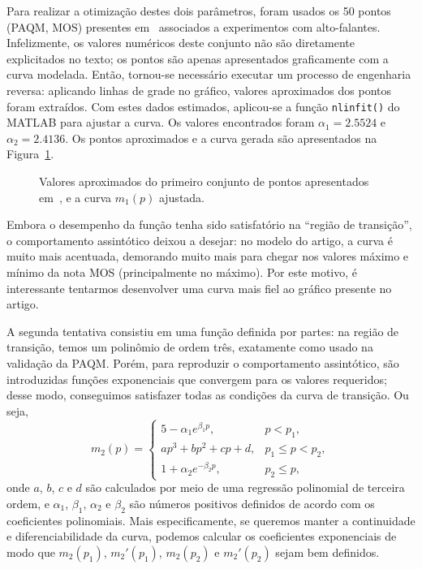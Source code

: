 Para realizar a otimização destes dois parâmetros, foram usados os 50 pontos (PAQM, MOS) presentes em~\cite{beerends-2002} associados a experimentos com alto-falantes. Infelizmente, os valores numéricos deste conjunto não são diretamente explicitados no texto; os pontos são apenas apresentados graficamente com a curva modelada. Então, tornou-se necessário executar um processo de engenharia reversa: aplicando linhas de grade no gráfico, valores aproximados dos pontos foram extraídos. Com estes dados estimados, aplicou-se a função \texttt{nlinfit()} do MATLAB para ajustar a curva. Os valores encontrados foram $\alpha_1 = 2.5524$ e $\alpha_2 = 2.4136$. Os pontos aproximados e a curva gerada são apresentados na Figura~\ref{fig:paqmtomos:sigmoid2}.

\begin{figure}[!ht]
    \centering
    
    \caption[Sigmoide com dois parâmetros de conversão de PAQM para MOS]{Valores aproximados do primeiro conjunto de pontos apresentados em~\cite{beerends-2002}, e a curva $m_1(p)$ ajustada.}
    \label{fig:paqmtomos:sigmoid2}
\end{figure}

Embora o desempenho da função tenha sido satisfatório na ``região de transição'', o comportamento assintótico deixou a desejar: no modelo do artigo, a curva é muito mais acentuada, demorando muito mais para chegar nos valores máximo e mínimo da nota MOS (principalmente no máximo). Por este motivo, é interessante tentarmos desenvolver uma curva mais fiel ao gráfico presente no artigo.

A segunda tentativa consistiu em uma função definida por partes: na região de transição, temos um polinômio de ordem três, exatamente como usado na validação da PAQM. Porém, para reproduzir o comportamento assintótico, são introduzidas funções exponenciais que convergem para os valores requeridos; desse modo, conseguimos satisfazer todas as condições da curva de transição. Ou seja,
\begin{equation}
    m_2(p) = \begin{cases}
        5 - \alpha_1 e^{\beta_1 p}, & p < p_1,\\
        a p^3 + b p^2 + c p + d, & p_1 \leq p < p_2,\\
        1 + \alpha_2 e^{-\beta_2 p}, & p_2 \leq p,
    \end{cases}
\end{equation}
onde $a$, $b$, $c$ e $d$ são calculados por meio de uma regressão polinomial de terceira ordem, e $\alpha_1$, $\beta_1$, $\alpha_2$ e $\beta_2$ são números positivos definidos de acordo com os coeficientes polinomiais. Mais especificamente, se queremos manter a continuidade e diferenciabilidade da curva, podemos calcular os coeficientes exponenciais de modo que $m_2(p_1)$, $m_2'(p_1)$, $m_2(p_2)$ e $m_2'(p_2)$ sejam bem definidos.

